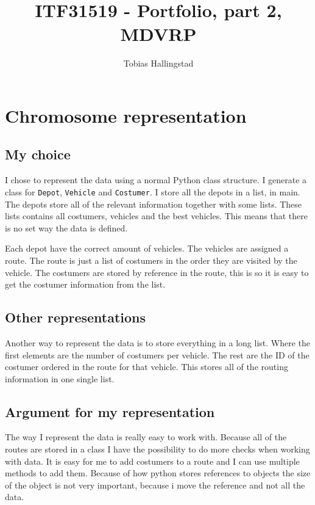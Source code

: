 \documentclass[10pt]{article}
\title{ITF31519 - Portfolio, part 2, MDVRP}
\author{Tobias Hallingstad}
\begin{document}
    \begin{titlepage}
        \maketitle
    \end{titlepage}


    \section{Chromosome representation}
    \subsection{My choice}
    I chose to represent the data using a normal Python class structure. I generate a class for \texttt{Depot}, \texttt{Vehicle} and \texttt{Costumer}. I store all the depots in a list, in main. The depots store all of the relevant information together with some lists. These lists contains all costumers, vehicles and the best vehicles. This means that there is no set way the data is defined. 

    Each depot have the correct amount of vehicles. The vehicles are assigned a route. The route is just a list of costumers in the order they are visited by the vehicle. The costumers are stored by reference in the route, this is so it is easy to get the costumer information from the list.

    \subsection{Other representations}
    Another way to represent the data is to store everything in a long list. Where the first elements are the number of costumers per vehicle. The rest are the ID of the costumer ordered in the route for that vehicle. This stores all of the routing information in one single list.

    \subsection{Argument for my representation}
    The way I represent the data is really easy to work with. Because all of the routes are stored in a class I have the possibility to do more checks when working with data. It is easy for me to add costumers to a route and I can use multiple methods to add them. Because of how python stores references to objects the size of the object is not very important, because i move the reference and not all the data.
\end{document}
